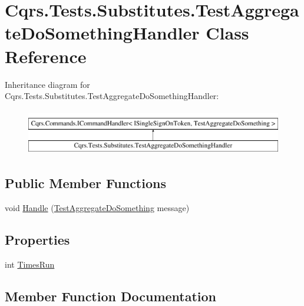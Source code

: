 \hypertarget{classCqrs_1_1Tests_1_1Substitutes_1_1TestAggregateDoSomethingHandler}{}\section{Cqrs.\+Tests.\+Substitutes.\+Test\+Aggregate\+Do\+Something\+Handler Class Reference}
\label{classCqrs_1_1Tests_1_1Substitutes_1_1TestAggregateDoSomethingHandler}
Inheritance diagram for Cqrs.\+Tests.\+Substitutes.\+Test\+Aggregate\+Do\+Something\+Handler\+:\begin{figure}[H]
\begin{center}
\leavevmode
\includegraphics[height=2.000000cm]{classCqrs_1_1Tests_1_1Substitutes_1_1TestAggregateDoSomethingHandler}
\end{center}
\end{figure}
\subsection*{Public Member Functions}
\begin{DoxyCompactItemize}
\item 
void \hyperlink{classCqrs_1_1Tests_1_1Substitutes_1_1TestAggregateDoSomethingHandler_a10331945a4d53abbf14b325f6c8f31f0}{Handle} (\hyperlink{classCqrs_1_1Tests_1_1Substitutes_1_1TestAggregateDoSomething}{Test\+Aggregate\+Do\+Something} message)
\end{DoxyCompactItemize}
\subsection*{Properties}
\begin{DoxyCompactItemize}
\item 
int \hyperlink{classCqrs_1_1Tests_1_1Substitutes_1_1TestAggregateDoSomethingHandler_a9f6430dedc93f389679be8abb9b93ab5}{Times\+Run}
\end{DoxyCompactItemize}


\subsection{Member Function Documentation}
\mbox{\label{classCqrs_1_1Tests_1_1Substitutes_1_1TestAggregateDoSomethingHandler_a10331945a4d53abbf14b325f6c8f31f0}} 
